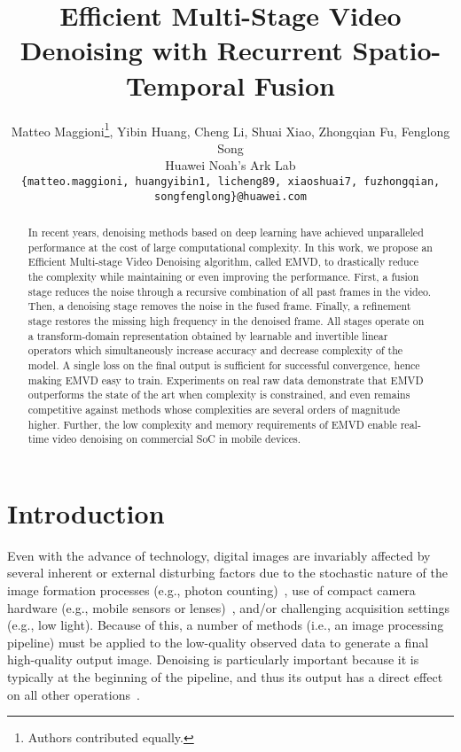 \documentclass[final]{cvpr}
\title{Efficient Multi-Stage Video Denoising with Recurrent Spatio-Temporal Fusion}
\author{
    Matteo Maggioni\thanks{Authors contributed equally.}, Yibin Huang\footnotemark[1], Cheng Li\footnotemark[1], Shuai Xiao, Zhongqian Fu, Fenglong Song\\
    {Huawei Noah's Ark Lab}\\
    {\tt\footnotesize \{matteo.maggioni, huangyibin1, licheng89, xiaoshuai7, fuzhongqian, songfenglong\}@huawei.com}
}
\begin{document}
    
    \maketitle
    
    \begin{abstract}
        In recent years, denoising methods based on deep learning have achieved unparalleled performance at the cost of large computational complexity. In this work, we propose an Efficient Multi-stage Video Denoising algorithm, called EMVD, to drastically reduce the complexity while maintaining or even improving the performance. First, a fusion stage reduces the noise through a recursive combination of all past frames in the video. Then, a denoising stage removes the noise in the fused frame. Finally, a refinement stage restores the missing high frequency in the denoised frame. All stages operate on a transform-domain representation obtained by learnable and invertible linear operators which simultaneously increase accuracy and decrease complexity of the model. A single loss on the final output is sufficient for successful convergence, hence making EMVD easy to train. Experiments on real raw data demonstrate that EMVD outperforms the state of the art when complexity is constrained, and even remains competitive against methods whose complexities are several orders of magnitude higher. Further, the low complexity and memory requirements of EMVD enable real-time video denoising on commercial SoC in mobile devices.
    \end{abstract}
    
    \section{Introduction}
    
    Even with the advance of technology, digital images are invariably affected by several inherent or external disturbing factors due to the stochastic nature of the image formation processes (e.g., photon counting)~\cite{foi2008noisemodel}, use of compact camera hardware (e.g., mobile sensors or lenses)~\cite{yue2020supervised}, and/or challenging acquisition settings (e.g., low light). Because of this, a number of methods (i.e., an image processing pipeline) must be applied to the low-quality observed data to generate a final high-quality output image. Denoising is particularly important because it is typically at the beginning of the pipeline, and thus its output has a direct effect on all other operations~\cite{wang2020practical}.
    
\end{document}
